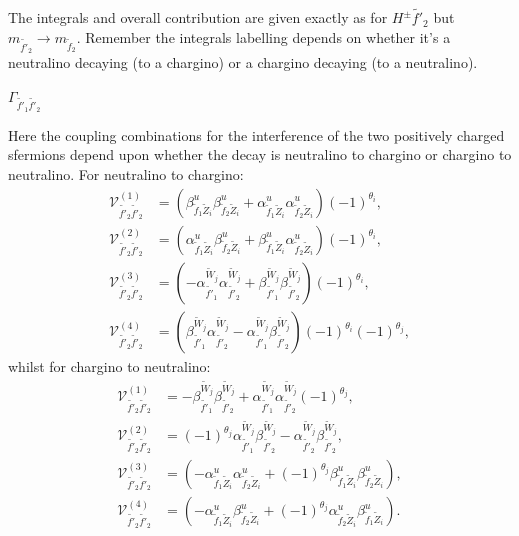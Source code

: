 \documentclass[final,3p,times]{elsarticle}
\begin{document}
The integrals and overall contribution are given exactly as for $H^{\pm} \tilde{f'}_2$ but $m_{\tilde{f'}_2} \rightarrow m_{\tilde{f}_2}$. Remember the integrals labelling depends on whether it's a neutralino decaying (to a chargino) or a chargino decaying (to a neutralino).

\textbf{\underline{$\Gamma_{\tilde{f'}_1 \tilde{f'}_2}$}}

Here the coupling combinations for the interference of the two positively charged sfermions depend upon whether the decay is neutralino to chargino or chargino to neutralino. For neutralino to chargino:
\begin{align}
\mathcal{V}_{\tilde{f'}_2 \tilde{f'}_2}^{(1)} &= (\beta_{\tilde{f}_1 \tilde{Z}_i}^{u} \beta_{\tilde{f}_2 \tilde{Z}_i}^{u} +  \alpha_{\tilde{f}_1 \tilde{Z}_i}^{u}\alpha_{\tilde{f}_2 \tilde{Z}_i}^{u})(-1)^{\theta_i}	, \\
\mathcal{V}_{\tilde{f'}_2 \tilde{f'}_2}^{(2)} &= (\alpha_{\tilde{f}_1 \tilde{Z}_i}^{u} \beta_{\tilde{f}_2 \tilde{Z}_i}^{u} +  \beta_{\tilde{f}_1 \tilde{Z}_i}^{u}\alpha_{\tilde{f}_2 \tilde{Z}_i}^{u})(-1)^{\theta_i}, \\
\mathcal{V}_{\tilde{f'}_2 \tilde{f'}_2}^{(3)} &= (-\alpha_{\tilde{f'}_1}^{\tilde{W}_j} \alpha_{\tilde{f'}_2}^{\tilde{W}_j} + \beta_{\tilde{f'}_1}^{\tilde{W}_j} \beta_{\tilde{f'}_2}^{\tilde{W}_j})(-1)^{\theta_i}, \\
\mathcal{V}_{\tilde{f'}_2 \tilde{f'}_2}^{(4)} &= (\beta_{\tilde{f'}_1}^{\tilde{W}_j}\alpha_{\tilde{f'}_2}^{\tilde{W}_j} - \alpha_{\tilde{f'}_1}^{\tilde{W}_j} \beta_{\tilde{f'}_2}^{\tilde{W}_j})(-1)^{\theta_i}(-1)^{\theta_j},
\end{align} 
whilst for chargino to neutralino:
\begin{align}
\mathcal{V}_{\tilde{f'}_2 \tilde{f'}_2}^{(1)} &= -\beta_{\tilde{f'}_1}^{\tilde{W}_j}\beta_{\tilde{f'}_2}^{\tilde{W}_j} + \alpha_{\tilde{f'}_1}^{\tilde{W}_j} \alpha_{\tilde{f'}_2}^{\tilde{W}_j}(-1)^{\theta_j}, \\
\mathcal{V}_{\tilde{f'}_2 \tilde{f'}_2}^{(2)} &= (-1)^{\theta_j} \alpha_{\tilde{f'}_1}^{\tilde{W}_j}\beta_{\tilde{f'}_2}^{\tilde{W}_j} - \alpha_{\tilde{f'}_2}^{\tilde{W}_j}\beta_{\tilde{f'}_2}^{\tilde{W}_j}, \\
\mathcal{V}_{\tilde{f'}_2 \tilde{f'}_2}^{(3)} &= (-\alpha_{\tilde{f}_1 \tilde{Z}_i}^{u}\alpha_{\tilde{f}_2 \tilde{Z}_i}^{u} + (-1)^{\theta_j}\beta_{\tilde{f}_1 \tilde{Z}_i}^{u} \beta_{\tilde{f}_2 \tilde{Z}_i}^{u}), \\
\mathcal{V}_{\tilde{f'}_2 \tilde{f'}_2}^{(4)} &= (-\alpha_{\tilde{f}_1 \tilde{Z}_i}^{u}\beta_{\tilde{f}_2 \tilde{Z}_i}^{u} + (-1)^{\theta_j}\alpha_{\tilde{f}_2 \tilde{Z}_i}^{u} \beta_{\tilde{f}_1 \tilde{Z}_i}^{u}).
\end{align}
\end{document}
